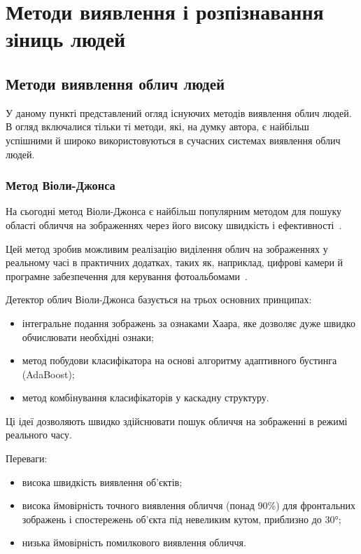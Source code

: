 \section{Методи виявлення і розпізнавання зіниць людей}
\subsection{Методи виявлення облич людей}
У даному пункті представлений огляд існуючих методів виявлення облич людей. 
В огляд включалися тільки ті методи, які, на думку автора, є найбільш успішними й широко використовуються в сучасних системах виявлення облич людей.

\subsubsection{Метод Віоли-Джонса}
На сьогодні метод Віоли-Джонса є
найбільш популярним методом для пошуку області обличчя на зображеннях через його високу швидкість і ефективності~\cite{Violaa,Violab}.

Цей метод зробив можливим реалізацію виділення облич на зображеннях у реальному часі в практичних додатках, таких як, наприклад, цифрові камери й програмне забезпечення для керування фотоальбомами~\cite{Violab}.

Детектор облич Віоли-Джонса базується на трьох основних принципах:
\begin{itemize}
	\item інтегральне подання зображень за ознаками Хаара, яке дозволяє дуже швидко обчислювати необхідні ознаки;
	\item метод побудови класифікатора на основі алгоритму адаптивного бустинга (AdaBoost);
	\item метод комбінування класифікаторів у каскадну структуру.
\end{itemize}

Ці ідеї дозволяють швидко здійснювати
пошук обличчя на зображенні в режимі реального часу.

Переваги:
\begin{itemize}
	\item висока швидкість виявлення об'єктів;
	\item висока ймовірність точного виявлення обличчя (понад 90\%) для фронтальних зображень і спостережень об'єкта під невеликим кутом, приблизно до 30°;
	\item низька ймовірність помилкового виявлення обличчя.
\end{itemize}

